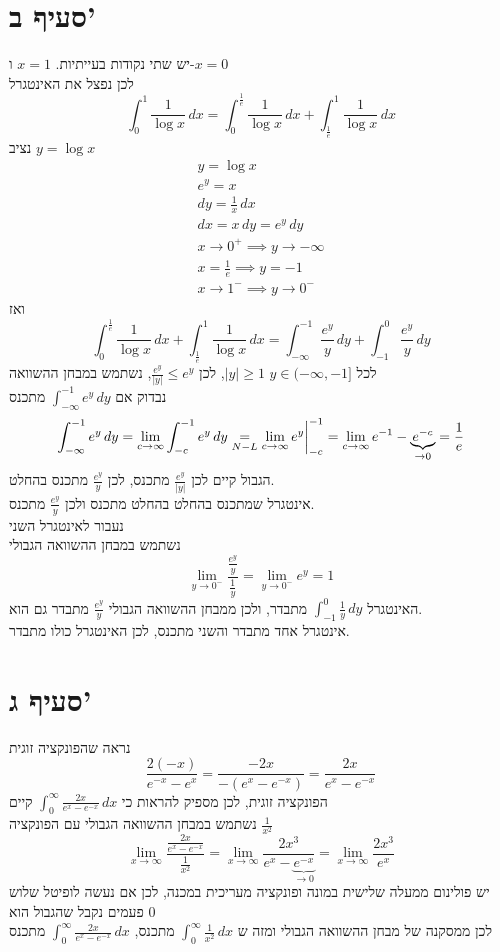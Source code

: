\documentclass[12pt, titlepage]{article}
\begin{document}
\section*{סעיף ב'}
יש שתי נקודות בעייתיות. $x=1$ ו-$x=0$ \\
לכן נפצל את האינטגרל
\[
	\int_0^1 \frac{1}{\log x}\,dx = \int_0^\frac{1}{e} \frac{1}{\log x}\,dx  + \int_\frac{1}{e}^1 \frac{1}{\log x}\,dx
\]
נציב $y= \log x$
\begin{gather*}
	y = \log x \\
	e^y = x\\
	dy = \frac{1}{x}\,dx\\
	dx = x \,dy = e^y \,dy\\
	x \to 0^+ \implies y \to -\infty \\
	x = \frac{1}{e} \implies y = -1 \\
	x \to 1^- \implies y \to 0^-
\end{gather*}
ואז
\[
	\int_0^\frac{1}{e} \frac{1}{\log x}\,dx  + \int_\frac{1}{e}^1 \frac{1}{\log x}\,dx = 	\int_{-\infty}^{-1} \frac{e^y}{y}\,dy  + \int_{-1}^0 \frac{e^y}{y} \,dy
\]
לכל $y\in(-\infty,-1]$ $\left|y\right|\geq1$, לכן $\frac{e^y}{\left|y\right|} \leq e^y$, נשתמש במבחן ההשוואה\\
נבדוק אם $\int_{-\infty}^{-1} e^y \, dy$ מתכנס
\[
    \int_{-\infty}^{-1} e^y \, dy  = \lim_{c\to\infty} \int_{-c}^{-1} e^y \, dy \underset{N-L}{=} \lim_{c\to\infty} e^y \bigg{|}^{-1}_{-c}  = \lim_{c\to\infty} e^{-1} - \underbrace{e^{-c}}_{\to 0} = \frac{1}{e}
\]
הגבול קיים לכן $\frac{e^y}{\left|y\right|}$ מתכנס, לכן $\frac{e^y}{y}$ מתכנס בהחלט.\\
אינטגרל שמתכנס בהחלט בהחלט מתכנס ולכן $\frac{e^y}{y}$ מתכנס.\\
נעבור לאינטגרל השני\\
נשתמש במבחן ההשוואה הגבולי
\[
    \lim_{y\to0^-} \frac{\frac{e^y}{y}}{\frac{1}{y}} = \lim_{y\to0^-} e^y = 1
\]
האינטגרל $\int^0_{-1} \frac{1}{y} \, dy$ מתבדר, ולכן ממבחן ההשוואה הגבולי $\frac{e^y}{y}$ מתבדר גם הוא.\\
אינטגרל אחד מתבדר והשני מתכנס, לכן האינטגרל כולו מתבדר.
\section*{סעיף ג'}
נראה שהפונקציה זוגית
\[
    \frac{2(-x)}{e^{-x}-e^{x}} = \frac{-2x}{-(e^x-e^{-x})}= \frac{2x}{e^x-e^{-x}}
\]
הפונקציה זוגית, לכן מספיק להראות כי $\int_0^\infty \frac{2x}{e^x-e^{-x}}\,dx$ קיים\\
נשתמש במבחן ההשוואה הגבולי עם הפונקציה $\frac{1}{x^2}$
\[
    \lim_{x\to\infty}  \frac{\frac{2x}{e^x-e^{-x}}}{\frac{1}{x^2}} = \lim_{x\to\infty} \frac{2x^3}{e^x-\underbrace{e^{-x}}_{\to0}}  = \lim_{x\to\infty} \frac{2x^3}{e^x}
\]
יש פולינום ממעלה שלישית במונה ופונקציה מעריכית במכנה, לכן אם נעשה לופיטל שלוש פעמים נקבל שהגבול הוא $0$\\
לכן ממסקנה של מבחן ההשוואה הגבולי ומזה ש $\int_0^\infty \frac{1}{x^2}\,dx$ מתכנס, $\int^\infty_0 \frac{2x}{e^x-e^{-x}} \, dx$ מתכנס
\newpage
\end{document}
